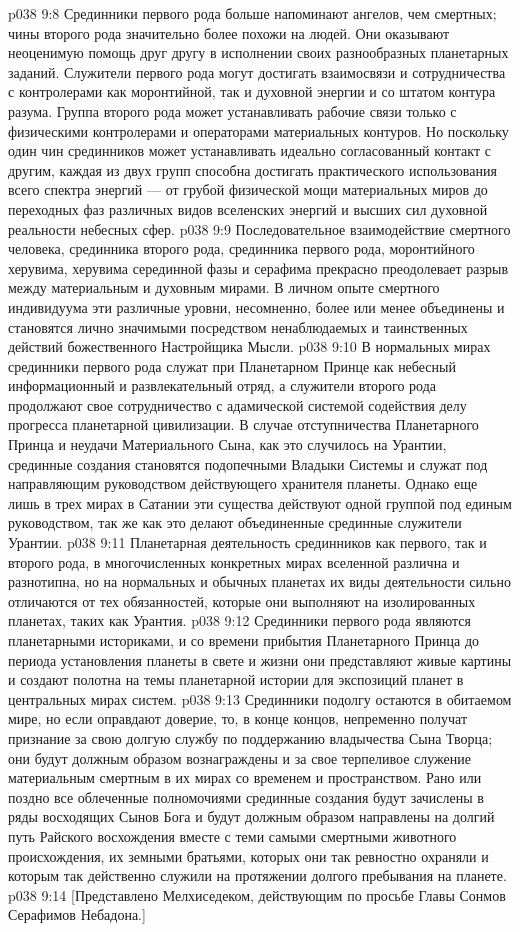 \vs p038 9:8 Срединники первого рода больше напоминают ангелов, чем смертных; чины второго рода значительно более похожи на людей. Они оказывают неоценимую помощь друг другу в исполнении своих разнообразных планетарных заданий. Служители первого рода могут достигать взаимосвязи и сотрудничества с контролерами как моронтийной, так и духовной энергии и со штатом контура разума. Группа второго рода может устанавливать рабочие связи только с физическими контролерами и операторами материальных контуров. Но поскольку один чин срединников может устанавливать идеально согласованный контакт с другим, каждая из двух групп способна достигать практического использования всего спектра энергий --- от грубой физической мощи материальных миров до переходных фаз различных видов вселенских энергий и высших сил духовной реальности небесных сфер.
\vs p038 9:9 Последовательное взаимодействие смертного человека, срединника второго рода, срединника первого рода, моронтийного херувима, херувима серединной фазы и серафима прекрасно преодолевает разрыв между материальным и духовным мирами. В личном опыте смертного индивидуума эти различные уровни, несомненно, более или менее объединены и становятся лично значимыми посредством ненаблюдаемых и таинственных действий божественного Настройщика Мысли.
\vs p038 9:10 \pc В нормальных мирах срединники первого рода служат при Планетарном Принце как небесный информационный и развлекательный отряд, а служители второго рода продолжают свое сотрудничество с адамической системой содействия делу прогресса планетарной цивилизации. В случае отступничества Планетарного Принца и неудачи Материального Сына, как это случилось на Урантии, срединные создания становятся подопечными Владыки Системы и служат под направляющим руководством действующего хранителя планеты. Однако еще лишь в трех мирах в Сатании эти существа действуют одной группой под единым руководством, так же как это делают объединенные срединные служители Урантии.
\vs p038 9:11 Планетарная деятельность срединников как первого, так и второго рода, в многочисленных конкретных мирах вселенной различна и разнотипна, но на нормальных и обычных планетах их виды деятельности сильно отличаются от тех обязанностей, которые они выполняют на изолированных планетах, таких как Урантия.
\vs p038 9:12 Срединники первого рода являются планетарными историками, и со времени прибытия Планетарного Принца до периода установления планеты в свете и жизни они представляют живые картины и создают полотна на темы планетарной истории для экспозиций планет в центральных мирах систем.
\vs p038 9:13 \pc Срединники подолгу остаются в обитаемом мире, но если оправдают доверие, то, в конце концов, непременно получат признание за свою долгую службу по поддержанию владычества Сына Творца; они будут должным образом вознаграждены и за свое терпеливое служение материальным смертным в их мирах со временем и пространством. Рано или поздно все облеченные полномочиями срединные создания будут зачислены в ряды восходящих Сынов Бога и будут должным образом направлены на долгий путь Райского восхождения вместе с теми самыми смертными животного происхождения, их земными братьями, которых они так ревностно охраняли и которым так действенно служили на протяжении долгого пребывания на планете.
\vsetoff
\vs p038 9:14 [Представлено Мелхиседеком, действующим по просьбе Главы Сонмов Серафимов Небадона.]
